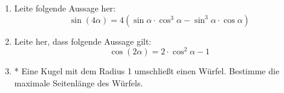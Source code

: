 \begin{enumerate}
 \item Leite folgende Aussage her: \[ \sin(4\alpha) = 4(\sin\alpha
\cdot \cos^3\alpha - \sin^3\alpha\cdot \cos\alpha)\]
 \item Leite her, dass folgende Aussage gilt:
\[\cos(2\alpha) = 2\cdot\cos^2\alpha -1 \]
 \item* Eine Kugel mit dem Radius 1 umschließt einen Würfel. Bestimme die
maximale Seitenlänge des Würfels.
\end{enumerate}

